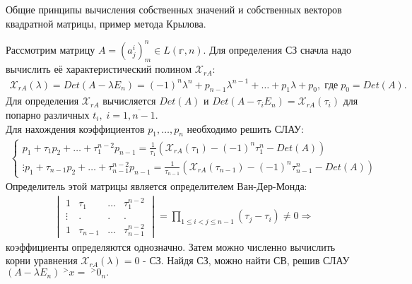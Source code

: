 \documentclass[__main__.tex]{subfiles}
\begin{document}
Общие принципы вычисления собственных значений и собственных векторов квадратной матрицы, пример метода Крылова.

Рассмотрим матрицу $A=(a^i_j)^n_m\in L(\mathbb r,n)$. Для определения СЗ сначла надо вычислить её характеристический полином $\mathcal{X}_{rA}$:
\begin{gather*}
	\mathcal{X}_{rA}(\lambda)=Det(A-\lambda E_n)=(-1)^n\lambda^n+p_{n-1}\lambda^{n-1}+\dots+p_1\lambda+p_0,\;где\;p_0=Det(A).
\end{gather*}
Для определения $\mathcal{X}_{rA}$ вычисляется $Det(A)$ и $Det(A-\tau_iE_n)=\mathcal{X}_{rA}(\tau_i)$ для попарно различных $t_i,\;i=\overline{1,n-1}$.\\
Для нахождения коэффициентов $p_1,\dots,p_n$ необходимо решить СЛАУ:
\begin{gather*}
\begin{cases}
	p_1+\tau_1 p_2+\dots+\tau^{n-2}_1 p_{n-1}=\frac{1}{\tau_1}\left(\mathcal{X}_{rA}(\tau_1)-(-1)^n\tau^n_1-Det(A)\right)\\
	\vdots
	p_1+\tau_{n-1} p_2+\dots+\tau^{n-2}_{n-1} p_{n-1}=\frac{1}{\tau_{n-1}}\left(\mathcal{X}_{rA}(\tau_{n-1})-(-1)^n\tau^n_{n-1}-Det(A)\right)
\end{cases}
\end{gather*}
Определитель этой матрицы является определителем Ван-Дер-Монда:
\begin{gather*}
	\begin{vmatrix}
		1 & \tau_1 & \dots & \tau^{n-2}_1 \\
		\vdots & . & . & . \\
		1 & \tau_{n-1} & \dots & \tau^{n-2}_{n-1}
	\end{vmatrix}
=\prod\limits_{1\le i < j\le n-1}(\tau_j-\tau_i)\ne 0\Rightarrow
\end{gather*}
коэффициенты определяются однозначно. Затем можно численно вычислить корни уравнения $	\mathcal{X}_{rA}(\lambda)=0$ - СЗ. Найдя СЗ, можно найти СВ, решив СЛАУ $(A-\lambda E_n)\;^{>}x=\;^{>}0_n.$\\
\end{document}
